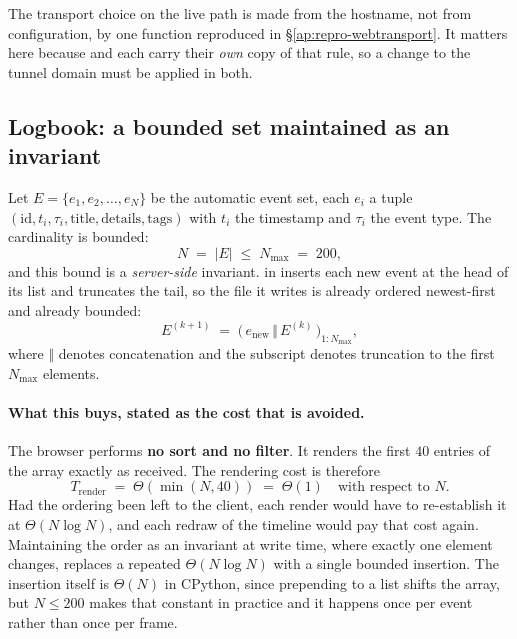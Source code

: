 \noindent The transport choice on the live path is made from the hostname,
not from configuration, by one function reproduced in
\S\ref{ap:repro-webtransport}. It matters here because  and
 each carry their \emph{own} copy of that rule, so a
change to the tunnel domain must be applied in both.

\subsection{Logbook: a bounded set maintained as an invariant}

Let $E = \{e_1, e_2, \dots, e_N\}$ be the automatic event set, each
$e_i$ a tuple $(\mathrm{id}, t_i, \tau_i, \text{title}, \text{details},
\text{tags})$ with $t_i$ the timestamp and $\tau_i$ the event type. The
cardinality is bounded:
\begin{equation}
N \;=\; |E| \;\le\; N_{\max} \;=\; 200 ,
\label{eq:logbookbound}
\end{equation}
and this bound is a \emph{server-side} invariant.  in
 inserts each new event at the head of its list and
truncates the tail, so the file it writes is already ordered newest-first and
already bounded:
\begin{equation}
E^{(k+1)} \;=\; \bigl(\,e_{\text{new}} \,\big\Vert\,
                E^{(k)}\,\bigr)_{1:N_{\max}} ,
\label{eq:logbookinsert}
\end{equation}
where $\Vert$ denotes concatenation and the subscript denotes truncation to
the first $N_{\max}$ elements.

\paragraph{What this buys, stated as the cost that is avoided.}
The browser performs \textbf{no sort and no filter}. It renders the first
$40$ entries of the array exactly as received. The rendering cost is therefore
\begin{equation}
T_{\text{render}} \;=\; \Theta(\min(N, 40)) \;=\; \Theta(1)
\quad\text{with respect to } N .
\label{eq:logbookrender}
\end{equation}
Had the ordering been left to the client, each render would have to
re-establish it at $\Theta(N \log N)$, and each redraw of the timeline would
pay that cost again. Maintaining the order as an invariant at write time,
where exactly one element changes, replaces a repeated $\Theta(N \log N)$ with
a single bounded insertion. The insertion itself is $\Theta(N)$ in CPython,
since prepending to a list shifts the array, but $N \le 200$ makes that
constant in practice and it happens once per event rather than once per frame.

